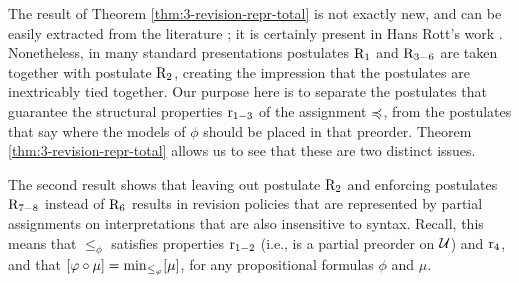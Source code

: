 
The result of Theorem \ref{thm:3-revision-repr-total} is not exactly new, 
and can be easily extracted from the literature \cite{KatsunoM92};
it is certainly present in Hans Rott's work \cite{Rott01}.
Nonetheless, in many standard presentations 
postulates $\mathrm{R}_{1}$ and $\mathrm{R}_{3-6}$ are taken together 
with postulate $\mathrm{R}_{2}$, creating the impression that the postulates
are inextricably tied together. 
Our purpose here is to separate the postulates
that guarantee the structural properties $\mathrm{r}_{1-3}$ 
of the assignment $\preccurlyeq$,
from the postulates that say where the 
models of $\phi$ should be placed in that preorder.
Theorem \ref{thm:3-revision-repr-total} 
allows us to see that these are two distinct issues.

The second result shows that leaving out postulate $\mathrm{R}_{2}$ 
and enforcing postulates $\mathrm{R}_{7-8}$ instead of $\mathrm{R}_{6}$
results in revision policies that are represented by partial assignments on interpretations
that are also insensitive to syntax.
Recall, this means that $\le_\phi$ satisfies properties 
$\mathrm{r}_{1-2}$ (i.e., is a partial preorder on $\mathcal{U}$)
and $\mathrm{r}_{4}$, and that
$[\varphi\circ\mu]={\operatorname{min}}_{\le_\varphi}[\mu]$,
for any propositional formulas $\phi$ and $\mu$.

